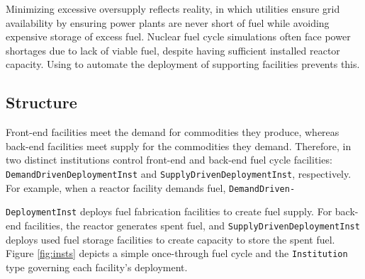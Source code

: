 Minimizing excessive oversupply 
reflects reality, in which utilities ensure grid availability 
by ensuring power plants are never short of fuel while 
avoiding expensive storage of excess fuel. 
Nuclear fuel cycle simulations often face power shortages 
due to lack of viable fuel, despite having sufficient installed 
reactor capacity.  
Using \deploy to automate the deployment of supporting 
facilities prevents this.  

\subsection{Structure}
Front-end facilities 
meet the demand for commodities they produce, whereas back-end 
facilities meet supply for the commodities they demand. 
Therefore, in \deploy two distinct institutions control 
front-end and back-end fuel cycle facilities: 
\texttt{DemandDrivenDeploymentInst} and 
\texttt{SupplyDrivenDeploymentInst}, respectively. 
For example, when a reactor facility 
demands fuel, \texttt{DemandDriven-}

\noindent
\texttt{DeploymentInst}
deploys fuel fabrication facilities to create fuel
supply. 
For back-end facilities, the reactor generates spent fuel, and 
\texttt{SupplyDrivenDeploymentInst} deploys 
used fuel storage facilities to create capacity to store the spent fuel. 
Figure \ref{fig:insts} depicts a simple once-through fuel cycle 
and the \texttt{Institution} type governing each 
facility's deployment.    

